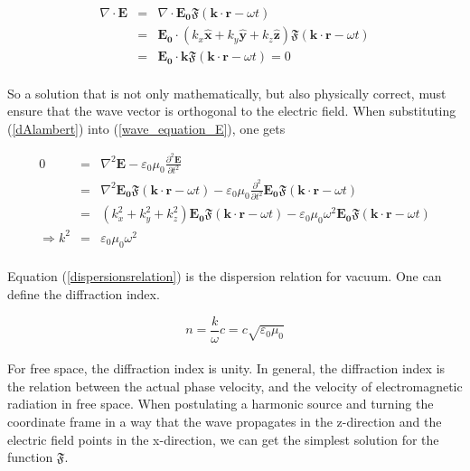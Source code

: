 \documentclass[a4paper,10pt]{thesis}
\begin{document}
\begin{eqnarray}
    \nabla \cdot \mathbf{E}&=& \nabla \cdot \mathbf{E_0}\mathfrak{F}(\mathbf{k}\cdot \mathbf{r}-\omega t)\\
&=& \mathbf{E_0} \cdot (k_x\mathbf{\hat{x}} + k_y\mathbf{\hat{y}}  + k_z \mathbf{\hat{z}} ) \mathfrak{F}(\mathbf{k}\cdot \mathbf{r}-\omega t) \nonumber \\
&=& \mathbf{E_0} \cdot \mathbf{k} \mathfrak{F}(\mathbf{k}\cdot \mathbf{r}-\omega t) = 0\nonumber
\end{eqnarray}

\paragraph*{}
So a solution that is not only mathematically, but also physically correct, must ensure that the wave vector is orthogonal to the electric field. When substituting (\ref{dAlambert}) into (\ref{wave_equation_E}), one gets

\begin{eqnarray}
0&=& \nabla^2 \mathbf{E}-\varepsilon_0 \mu_0 \frac{\partial^2 \mathbf{E}}{\partial t^2}\\
&=& \nabla^2 \mathbf{E_0}\mathfrak{F}(\mathbf{k}\cdot \mathbf{r}-\omega t)-\varepsilon_0 \mu_0 \frac{\partial^2 }{\partial t^2} \mathbf{E_0}\mathfrak{F}(\mathbf{k}\cdot \mathbf{r}-\omega t)\nonumber
\\
&=& (k_x^2 + k_y^2 + k_z^2) \mathbf{E_0} \mathfrak{F}(\mathbf{k}\cdot \mathbf{r}-\omega t)-\varepsilon_0 \mu_0  \omega^2 \mathbf{E_0}\mathfrak{F}(\mathbf{k}\cdot \mathbf{r}-\omega t)\nonumber
\\
\Rightarrow k^2 &=& \varepsilon_0 \mu_0  \omega^2 \label{dispersionsrelation}
\end{eqnarray}

\paragraph*{}
Equation (\ref{dispersionsrelation}) is the dispersion relation for vacuum. One can define the diffraction index.

\begin{equation}\label{brechungsindex}
    n=\frac{k}{\omega}c= c\sqrt{\varepsilon_0 \mu_0}
\end{equation}

\paragraph*{}
For free space, the diffraction index is unity. In general, the diffraction index is the relation between the actual phase velocity, and the velocity of electromagnetic radiation in free space. When postulating a harmonic source and turning the coordinate frame in a way that the wave propagates in the z-direction and the electric field points in the x-direction, we can get the simplest solution for the function $\mathfrak{F}$.
\end{document}
